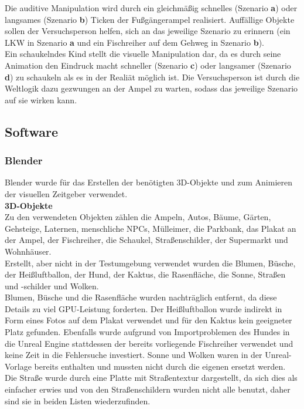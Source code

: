 \documentclass{Bericht}
\begin{document}
Die auditive Manipulation wird durch ein gleichmäßig schnelles (Szenario \textbf{a}) oder langsames (Szenario \textbf{b}) Ticken der Fußgängerampel realisiert. Auffällige Objekte sollen der Versuchsperson helfen, sich an das jeweilige Szenario zu erinnern (ein LKW in Szenario \textbf{a} und ein Fischreiher auf dem Gehweg in Szenario \textbf{b}).\\
Ein schaukelndes Kind stellt die visuelle Manipulation dar, da es durch seine Animation den Eindruck macht schneller (Szenario \textbf{c}) oder langsamer (Szenario \textbf{d}) zu schaukeln als es in der Realiät möglich ist. Die Versuchsperson ist durch die Weltlogik dazu gezwungen an der Ampel zu warten, sodass das jeweilige Szenario auf sie wirken kann.


\subsection{Software}
\subsubsection{Blender}
Blender wurde für das Erstellen der benötigten 3D-Objekte und zum Animieren der visuellen Zeitgeber verwendet.\\

\textbf{3D-Objekte}\\
Zu den verwendeten Objekten zählen die Ampeln, Autos, Bäume, Gärten, Gehsteige, Laternen, menschliche NPCs, Mülleimer, die Parkbank, das Plakat an der Ampel, der Fischreiher, die Schaukel, Straßenschilder, der Supermarkt und Wohnhäuser.\\
 Erstellt, aber nicht in der Testumgebung verwendet wurden die Blumen, Büsche, der Heißluftballon, der Hund, der Kaktus, die Rasenfläche, die Sonne, Straßen und -schilder und Wolken.\\
		Blumen, Büsche und die Rasenfläche wurden nachträglich entfernt, da diese Details zu viel GPU-Leistung forderten. Der Heißluftballon wurde indirekt in Form eines Fotos auf dem Plakat verwendet und für den Kaktus kein geeigneter Platz gefunden. Ebenfalls wurde aufgrund von Importproblemen des Hundes in die Unreal Engine stattdessen der bereits vorliegende Fischreiher verwendet und keine Zeit in die Fehlersuche investiert.
 		Sonne und Wolken waren in der Unreal-Vorlage bereits enthalten und mussten nicht durch die eigenen ersetzt werden. 
		Die Straße wurde durch eine Platte mit Straßentextur dargestellt, da sich dies als einfacher erwies und von den Straßenschildern wurden nicht alle benutzt, daher sind sie in beiden Listen wiederzufinden.\\
		
\end{document}
